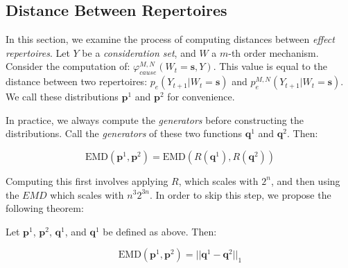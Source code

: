 \subsection{Distance Between Repertoires}
In this section, we examine the process of computing distances between \textit{effect repertoires}. Let $Y$ be a \textit{consideration set}, and $W$ a $m$-th order mechanism. Consider the computation of: $\varphi^{M,N}_{cause}(W_t = \mathbf{s}, Y)$. This value is equal to the distance between two repertoires: $p_e(Y_{t+1}|W_t = \mathbf{s})$ and $p_e^{M,N}(Y_{t+1}|W_t = \mathbf{s})$. We call these distributions $\mathbf{p}^1$ and $\mathbf{p}^2$ for convenience.

In practice, we always compute the \textit{generators} before constructing the distributions. Call the \textit{generators} of these two functions $\mathbf{q}^1$ and $\mathbf{q}^2$. Then:

\begin{equation}
\label{eq:demonstrating_idea1}
\text{EMD}(\mathbf{p}^1, \mathbf{p}^2) =\text{EMD}(R(\mathbf{q}^1), R(\mathbf{q}^2))
\end{equation}

Computing this first involves applying $R$, which scales with $2^n$, and then using the $EMD$ which scales with $n^3 2^{3n}$. In order to skip this step, we propose the following theorem:

\begin{theorem}
	\label{thm:speedup}
	Let $\mathbf{p}^1$, $\mathbf{p}^2$, $\mathbf{q}^1$, and $\mathbf{q}^1$ be defined as above. Then:
	
	\begin{equation}
	\label{eq:theorem_statement}
	\text{EMD}(\mathbf{p}^1, \mathbf{p}^2)= ||\mathbf{q}^1 - \mathbf{q}^2||_1
	\end{equation}
\end{theorem}

